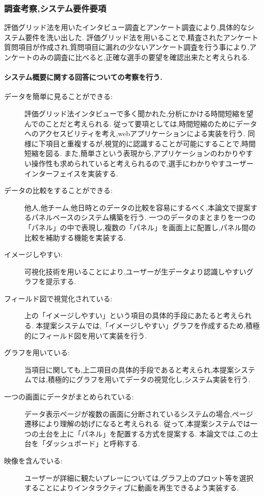 \documentclass[sotsuron]{kuee}
\begin{document}
			\subsubsection{調査考察,システム要件要項}
				評価グリッド法を用いたインタビュー調査とアンケート調査により,具体的なシステム要件を洗い出した. 
				評価グリッド法を用いることで,精査されたアンケート質問項目が作成され,質問項目に漏れの少ないアンケート調査を行う事により,アンケートのみの調査に比べると,正確な選手の要望を確認出来たと考えられる. 
					\paragraph {システム概要に関する回答についての考察を行う. }
						\begin{description}
							\item [データを簡単に見ることができる:]
							評価グリッド法インタビューで多く聞かれた,分析にかける時間短縮を望んでのことだと考えられる. 
							従って要項としては,時間短縮のためにデータへのアクセスビリティを考え,webアプリケーションによる実装を行う. 
							同様に下項目と重複するが,視覚的に認識することが可能にすることで,時間短縮を図る. 
							また,簡単さという表現から,アプリケーションのわかりやすい操作性も求められていると考えられるので,選手にわかりやすユーザーインターフェイスを実装する. 
							\item [データの比較をすることができる:]
							他人,他チーム,他日時とのデータの比較を容易にするべく,本論文で提案するパネルベースのシステム構築を行う. 一つのデータのまとまりを一つの「パネル」の中で表現し,複数の「パネル」を画面上に配置し,パネル間の比較を補助する機能を実装する. 
							\item [イメージしやすい:]
							可視化技術を用いることにより,ユーザーが生データより認識しやすいグラフを提示する. 
							\item [フィールド図で視覚化されている:]
							上の「イメージしやすい」という項目の具体的手段にあたると考えられる. 本提案システムでは,「イメージしやすい」グラフを作成するため,積極的にフィールド図を用いて実装を行う. 
							\item [グラフを用いている:]
							当項目に関しても,上二項目の具体的手段であると考えられ,本提案システムでは,積極的にグラフを用いてデータの視覚化し,システム実装を行う. 
							\item [一つの画面にデータがまとめられている:]
							データ表示ページが複数の画面に分断されているシステムの場合,ページ遷移により理解の妨げになると考えられる. 従って,本提案システムでは一つの土台を上に「パネル」を配置する方式を提案する. 本論文では,この土台を「ダッシュボード」と呼称する. 
							\item [映像を含んでいる:]
							ユーザーが詳細に観たいプレーについては,グラフ上のプロット等を選択することによりインタラクティブに動画を再生できるよう実装する. 
						\end{description}
\end{document}
